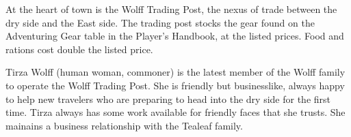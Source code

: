 At the heart of town is the Wolff Trading Post, the nexus of trade between the dry side and the East side.
The trading post stocks the gear found on the Adventuring Gear table in the Player's Handbook, at the listed prices.
Food and rations cost double the listed price.

Tirza Wolff (human woman, commoner) is the latest member of the Wolff family to operate the Wolff Trading Post.
She is friendly but businesslike, always happy to help new travelers who are preparing to head into the dry side for the first time.
Tirza always has some work available for friendly faces that she trusts.
She mainains a business relationship with the Tealeaf family.
